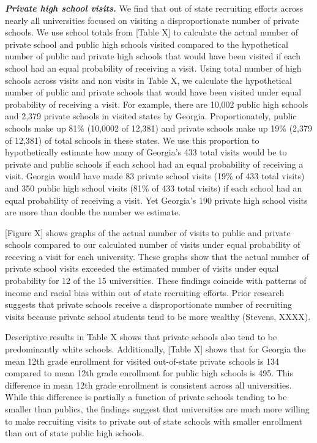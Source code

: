\documentclass[twoside]{article}
\begin{document}
\textbf{\textit{Private high school visits.}} We find that out of state recruiting efforts across nearly all universities focused on visiting a disproportionate number of private schools. We use school totals from [Table X] to calculate the actual number of private school and public high schools visited compared to the hypothetical number of public and private high schools that would have been visited if each school had an equal probability of receiving a visit. Using total number of high schools across visits and non visits in Table X, we calculate the hypothetical number of public and private schools that would have been visited under equal probability of receiving a visit. For example, there are 10,002 public high schools and 2,379 private schools in visited states by Georgia. Proportionately, public schools  make up 81\%  (10,0002 of 12,381) and private schools make up 19\% (2,379 of 12,381) of total schools in these states. We use this proportion to hypothetically estimate how many of Georgia's 433 total visits would be to private and public schools if each school had an equal probability of receiving a visit. Georgia would have made 83 private school visits (19\% of 433 total visits) and 350 public high school visits (81\% of 433 total visits) if each school had an equal probability of receiving a visit. Yet Georgia’s 190 private high school visits are more than double the number we estimate. 

[Figure X] shows graphs of the actual number of visits to public and private schools compared to our calculated number of visits under equal probability of receving a visit for each university. These graphs show that the actual number of private school visits exceeded the estimated number of visits under equal probability for 12 of the 15 universities. These findings coincide with patterns of income and racial bias within out of state recruiting efforts. Prior research suggests that private schools receive a disproportionate number of recruiting visits because private school students tend to be more wealthy (Stevens, XXXX). 

Descriptive results in Table X shows that private schools also tend to be predominantly white schools. Additionally, [Table X] shows that for Georgia the mean 12th grade enrollment for visited out-of-state private schools is 134 compared to mean 12th grade enrollment for public high schools is 495. This difference in mean 12th grade enrollment is consistent across all universities. While this difference is partially a function of private schools tending to be smaller than publics, the findings suggest that universities are much more willing to make recruiting visits to private out of state schools with smaller enrollment than out of state public high schools. 
\end{document}
